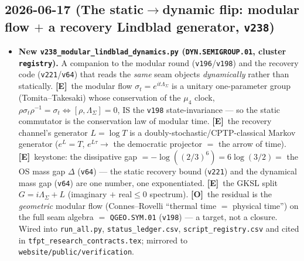 \documentclass[11pt]{article}
\providecommand{\mE}{\textbf{[E]}}\providecommand{\mC}{\textbf{[C]}}
\providecommand{\mO}{\textbf{[O]}}\providecommand{\mX}{\textbf{[X]}}
\providecommand{\vref}[1]{\texttt{#1}}
\begin{document}
\subsection*{2026-06-17 (The static$\to$dynamic flip: modular flow $+$ a recovery Lindblad generator, \texttt{v238})}
\begin{itemize}
\item \textbf{New \texttt{v238\_modular\_lindblad\_dynamics.py} (\texttt{DYN.SEMIGROUP.01}, cluster
  \texttt{registry}).} A companion to the modular round (\vref{v196}/\vref{v198}) and the recovery code
  (\vref{v221}/\vref{v64}) that reads the \emph{same} seam objects \emph{dynamically} rather than
  statically. \mE\ the modular flow $\sigma_t=e^{i t\Lambda_\Sigma}$ is a unitary one-parameter group
  (Tomita--Takesaki) whose conservation of the $\mu_4$ clock,
  $\rho\sigma_t\rho^{-1}=\sigma_t\Leftrightarrow[\rho,\Lambda_\Sigma]=0$, IS the \vref{v198}
  state-invariance --- so the static commutator is the conservation law of modular time. \mE\ the
  recovery channel's generator $L=\log T$ is a doubly-stochastic/CPTP-classical Markov generator
  ($e^{L}=T$, $e^{L\tau}\to$ the democratic projector $=$ the arrow of time). \mE\ keystone: the
  dissipative gap $=-\log((2/3)^6)=6\log(3/2)=$ the OS mass gap $\Delta$ (\vref{v64}) --- the static
  recovery bound (\vref{v221}) and the dynamical mass gap (\vref{v64}) are one number, one
  exponentiated. \mE\ the GKSL split $G=i\Lambda_\Sigma+L$ (imaginary $+$ real$\le0$ spectrum). \mO\
  the residual is the \emph{geometric} modular flow (Connes--Rovelli ``thermal time $=$ physical
  time'') on the full seam algebra $=$ \texttt{QGEO.SYM.01} (\vref{v198}) --- a target, not a closure.
  Wired into \texttt{run\_all.py}, \texttt{status\_ledger.csv}, \texttt{script\_registry.csv} and cited
  in \texttt{tfpt\_research\_contracts.tex}; mirrored to \texttt{website/public/verification}.
\end{itemize}
\end{document}
